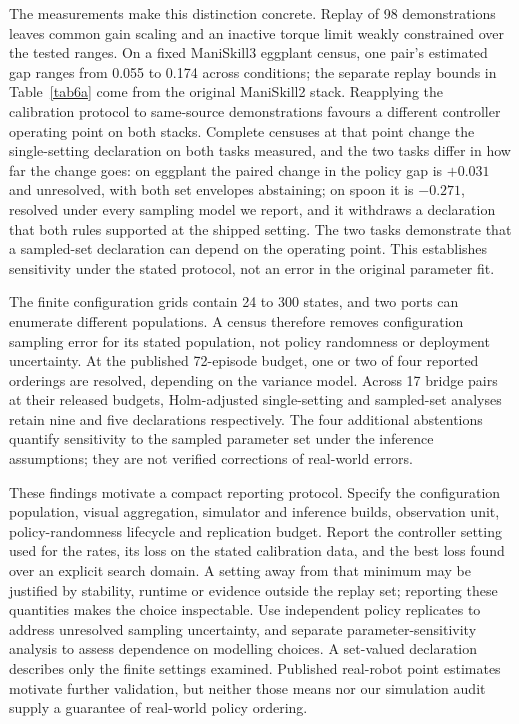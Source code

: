 \documentclass[pdflatex,iicol,sn-apa]{sn-jnl}
\theoremstyle{remark}
\begin{document}
The measurements make this distinction concrete. Replay of 98 demonstrations leaves common gain
scaling and an inactive torque limit weakly constrained over the tested ranges. On a fixed
ManiSkill3 eggplant census, one pair's estimated gap ranges from 0.055 to 0.174 across conditions;
the separate replay bounds in Table~\ref{tab6a} come from the original ManiSkill2 stack. Reapplying
the calibration protocol to same-source demonstrations favours a different controller operating
point on both stacks. Complete censuses at that point change the single-setting declaration on both
tasks measured, and the two tasks differ in how far the change goes: on eggplant the paired change
in the policy gap is $+0.031$ and unresolved, with both set envelopes abstaining; on spoon it is
$-0.271$, resolved under every sampling model we report, and it withdraws a declaration that both
rules supported at the shipped setting. The two tasks demonstrate that a sampled-set declaration
can depend on the operating point. This establishes sensitivity under
the stated protocol, not an error in the original parameter fit.

The finite configuration grids contain 24 to 300 states, and two ports can enumerate different
populations. A census therefore removes configuration sampling error for its stated population,
not policy randomness or deployment uncertainty. At the published 72-episode budget, one or two
of four reported orderings are resolved, depending on the variance model. Across 17 bridge pairs
at their released budgets, Holm-adjusted single-setting and sampled-set analyses retain nine and
five declarations respectively. The four additional abstentions quantify sensitivity to the sampled
parameter set under the inference assumptions; they are not verified corrections of real-world errors.

These findings motivate a compact reporting protocol. Specify the configuration population, visual
aggregation, simulator and inference builds, observation unit, policy-randomness lifecycle and
replication budget. Report the controller setting used for the rates, its loss on the stated
calibration data, and the best loss found over an explicit search domain. A setting away from that
minimum may be justified by stability, runtime or evidence outside the replay set; reporting these
quantities makes the choice inspectable. Use independent policy replicates to address unresolved
sampling uncertainty, and separate parameter-sensitivity analysis to assess dependence on modelling
choices. A set-valued declaration describes only the finite settings examined. Published real-robot
point estimates motivate further validation, but neither those means nor our simulation audit supply
a guarantee of real-world policy ordering.
\end{document}
